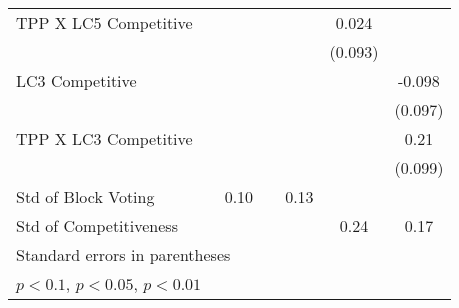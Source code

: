 {\begin{tabular}{l*{6}{c}}
TPP X LC5 Competitive&                  &                  &                  &                  &    0.024         &                  \\
                &                  &                  &                  &                  &  (0.093)         &                  \\
LC3 Competitive &                  &                  &                  &                  &                  &   -0.098         \\
                &                  &                  &                  &                  &                  &  (0.097)         \\
TPP X LC3 Competitive&                  &                  &                  &                  &                  &     0.21\sym{*}  \\
                &                  &                  &                  &                  &                  &  (0.099)         \\
\midrule
Std of Block Voting&                  &     0.10         &                  &     0.13         &                  &                  \\
Std of Competitiveness&                  &                  &                  &                  &     0.24         &     0.17         \\
\bottomrule
\multicolumn{7}{l}{\footnotesize Standard errors in parentheses}\\
\multicolumn{7}{l}{\footnotesize \sym{*} \(p<0.1\), \sym{**} \(p<0.05\), \sym{***} \(p<0.01\)}\\
\end{tabular}
}
